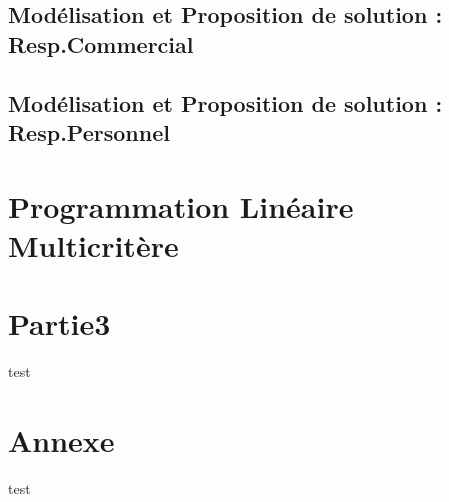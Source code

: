 \documentclass[a4paper, 11pt]{article}
\begin{document}
\subsection{Modélisation et Proposition de solution : Resp.Commercial}
\subsection{Modélisation et Proposition de solution : Resp.Personnel}

\section{Programmation Linéaire Multicritère}

\section{Partie3}
test

\section*{Annexe}
test
\end{document}
